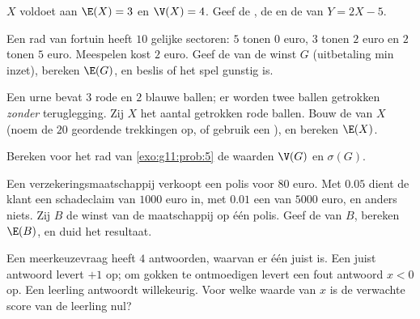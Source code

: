 \begin{exercise}[$\star$]\label{exo:g11:prob:4}
$X$ voldoet aan $\E(X) = 3$ en $\V(X) = 4$. Geef de , de
 en de  van $Y = 2X - 5$.
\end{exercise}

\begin{exercise}[$\star\star$]\label{exo:g11:prob:5}
Een rad van fortuin heeft $10$ gelijke sectoren: $5$ tonen $0$ euro, $3$
tonen $2$ euro en $2$ tonen $5$ euro. Meespelen kost $2$ euro. Geef de
 van de winst $G$ (uitbetaling min inzet), bereken $\E(G)$, en
beslis of het spel gunstig is.
\end{exercise}

\begin{exercise}[$\star\star$]\label{exo:g11:prob:6}
Een urne bevat $3$ rode en $2$ blauwe ballen; er worden twee ballen
getrokken \emph{zonder} teruglegging. Zij $X$ het aantal getrokken rode
ballen. Bouw de  van $X$ (noem de $20$ geordende trekkingen op,
of gebruik een ), en bereken $\E(X)$.
\end{exercise}

\begin{exercise}[$\star\star$]\label{exo:g11:prob:7}
Bereken voor het rad van \cref{exo:g11:prob:5} de waarden $\V(G)$ en
$\sigma(G)$.
\end{exercise}

\begin{exercise}[$\star\star$]\label{exo:g11:prob:8}
Een verzekeringsmaatschappij verkoopt een polis voor $80$ euro. Met 
$0.05$ dient de klant een schadeclaim van $1000$ euro in, met  $0.01$
een van $5000$ euro, en anders niets. Zij $B$ de winst van de maatschappij
op één polis. Geef de  van $B$, bereken $\E(B)$, en duid het
resultaat.
\end{exercise}

\begin{exercise}[$\star\star$]\label{exo:g11:prob:9}
Een meerkeuzevraag heeft $4$ antwoorden, waarvan er één juist is. Een juist
antwoord levert $+1$ op; om gokken te ontmoedigen levert een fout antwoord
$x < 0$ op. Een leerling antwoordt willekeurig. Voor welke waarde van $x$ is
de verwachte score van de leerling nul?
\end{exercise}

